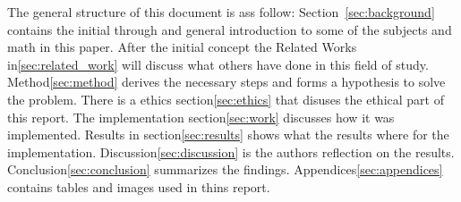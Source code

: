The general structure of this document is ass follow:
Section~\ref{sec:background} contains the initial through and general introduction to some of the subjects and math in this paper.
After the initial concept the Related Works in\ref{sec:related_work} will discuss what others have done in this field of study.
Method\ref{sec:method} derives the necessary steps and forms a hypothesis to solve the problem.
There is a ethics section\ref{sec:ethics} that disuses the ethical part of this report.
The implementation section\ref{sec:work} discusses how it was implemented.
Results in section\ref{sec:results} shows what the results where for the implementation.
Discussion\ref{sec:discussion} is the authors reflection on the results.
Conclusion\ref{sec:conclusion} summarizes the findings.
Appendices\ref{sec:appendices} contains tables and images used in thins report.











